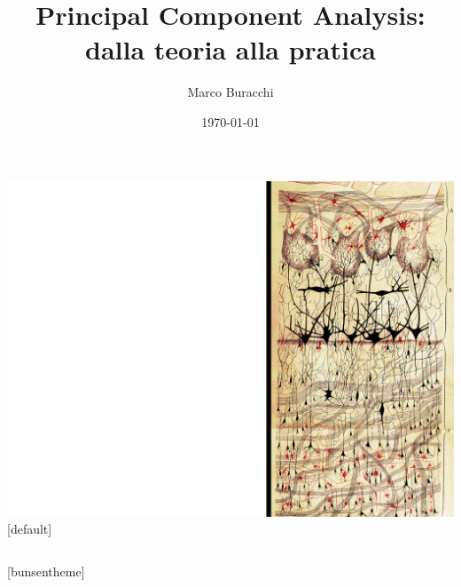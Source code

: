 \documentclass[xcolor={dvipsnames}]{beamer}
\title{Principal Component Analysis: dalla teoria alla pratica}
\author{Marco Buracchi}
\institute{Università degli studi di Firenze}
\date{\today}
\begin{document}
	
	{\includegraphics[width=\paperwidth,height=\paperheight]{frontpage_bg}}
	[default]
		
	{
		\logo{}
		\begin{frame}
			\vspace{2cm}
			\begin{columns}
				\column{2.75in}
				\titlepage
				\vspace{10cm}
				\column{2.0in}
			\end{columns}
		\end{frame}
	}

%
[bunsentheme]
\end{document}
